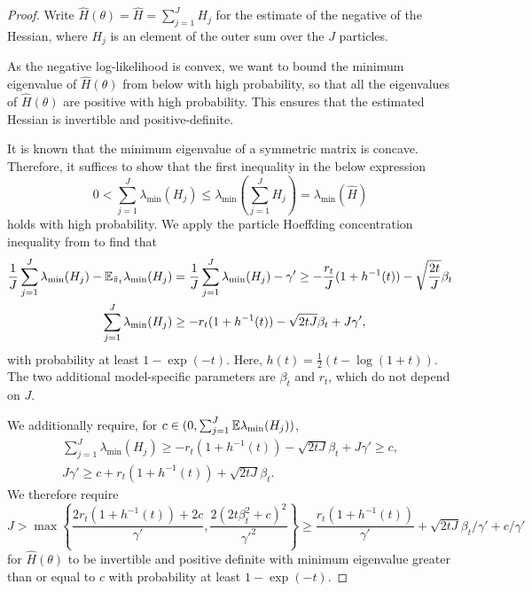 \begin{proof}
Write $\hat{H}(\theta) = \hat{H} = \sum_{j=1}^J H_j$ for the estimate of the negative of the Hessian, where $H_j$ is an element of the outer sum over the $J$ particles.

As the negative log-likelihood is convex, we want to bound the minimum eigenvalue of $\hat{H}(\theta)$ from below with high probability, so that all the eigenvalues of $\hat{H}(\theta)$ are positive with high probability. This ensures that the estimated Hessian is invertible and positive-definite.

It is known that the minimum eigenvalue of a symmetric matrix is concave. Therefore, it suffices to show that the first inequality in the below expression
\begin{equation}
    0 < \sum_{j=1}^J \lambda_{\min} (H_j) \leq  \lambda_{\min}\left(\sum_{j=1}^J H_j\right) = \lambda_{\min} (\hat{H})
\end{equation}
holds with high probability.
We apply the particle Hoeffding concentration inequality from \cite{delMoral11} to find that  
\begin{align}
    \frac{1}{J}\sum_{j=1}^J \lambda_{\min}(H_j) - \mathbb{E}_{\tilde{\pi}_t}\lambda_{\min}(H_j) &= \frac{1}{J}\sum_{j=1}^J \lambda_{\min}(H_j) - \gamma' \geq -\frac{r_t}{J}(1+h^{-1}(t)) - \sqrt{\frac{2t}{J}}\beta_t \\
    \sum_{j=1}^J \lambda_{\min}(H_j) &\geq -r_t(1+h^{-1}(t)) - \sqrt{2tJ}\beta_t + J\gamma',
\end{align}
with probability at least $1-\exp(-t)$. Here, $h(t) = \frac{1}{2}(t - \log(1+t))$. 
The two additional model-specific parameters are $\beta_t$ and $r_t$, which do not depend on $J$. 

We additionally require, for $c \in (0, \sum_{j=1}^J \mathbb{E}\lambda_{\min}(H_j))$,
\begin{align}
    \sum_{j=1}^J \lambda_{\min}(H_j) \geq -r_t(1+h^{-1}(t)) - \sqrt{2tJ}\beta_t + J\gamma' \geq c, \\
    J\gamma' \geq c + r_t(1+h^{-1}(t)) + \sqrt{2tJ}\beta_t.
\end{align}
We therefore require 
$$J > \max\left\{\frac{2r_t(1+h^{-1}(t)) + 2c}{\gamma'}, \frac{2(2t\beta_t^2+c)^2}{\gamma'^2}\right\} \geq  \frac{r_t(1+h^{-1}(t))}{\gamma'} + \sqrt{2tJ}\beta_t/\gamma' + c/\gamma'$$
for $\hat{H}(\theta)$ to be invertible and positive definite with minimum eigenvalue greater than or equal to $c$ with probability at least $1-\exp(-t)$.

\end{proof}


